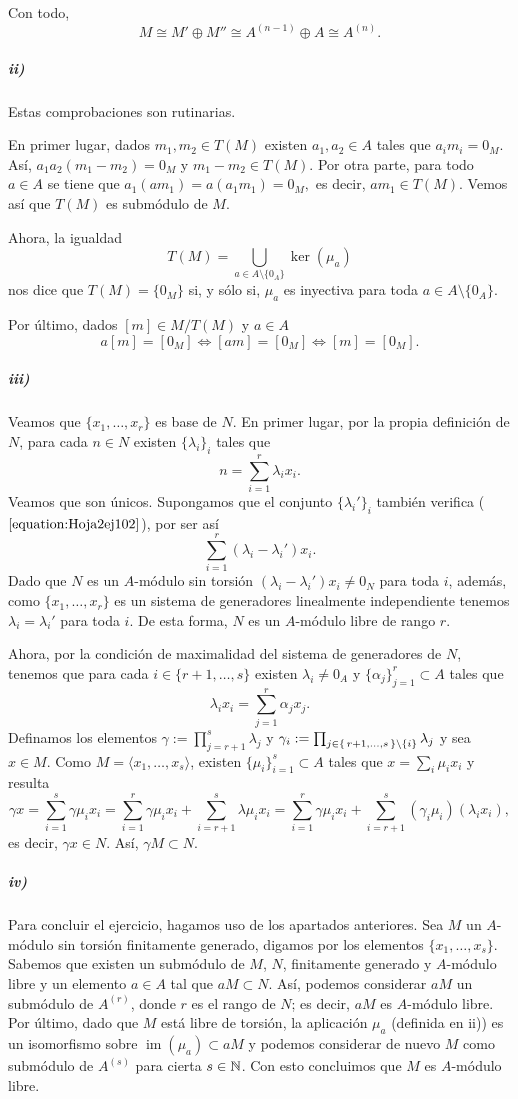\documentclass[./ejercicios.tex]{subfiles}
\begin{document}
Con todo,
$$M\cong M'\oplus M''\cong A^{(n-1)}\oplus A\cong A^{(n)}.$$

\subparagraph{ii)} Estas comprobaciones son rutinarias.

En primer lugar, dados $m_1,m_2\in T(M)$ existen $a_1,a_2\in A$ tales que $a_im_i=0_M$. Así, $a_1a_2(m_1-m_2)=0_M$ y $m_1-m_2\in T(M).$ Por otra parte, para todo $a\in A$ se tiene que $a_1(am_1)=a(a_1m_1)=0_M,$ es decir, $am_1\in T(M)$. Vemos así que $T(M)$ es submódulo de $M$.

Ahora, la igualdad
$$T(M)=\bigcup_{a\in A\setminus\{0_A\}}\ker(\mu_a)$$ nos dice que $T(M)=\{0_M\}$ si, y sólo si, $\mu_a$ es inyectiva para toda $a\in A\setminus\{0_A\}.$

Por último, dados $[m]\in M/T(M)$ y $a\in A$
$$a[m]=[0_M]\Longleftrightarrow [am]=[0_M]\Longleftrightarrow [m]=[0_M].$$

\subparagraph{iii)} Veamos que $\{x_1,\dots,x_r\}$ es base de $N$. En primer lugar, por la propia definición de $N$, para cada $n\in N$ existen $\{\lambda_i\}_i$ tales que
\begin{equation}\label{equation:Hoja2ej102}
n=\sum_{i=1}^r\lambda_ix_i.
\end{equation}
Veamos que son únicos. Supongamos que el conjunto $\{\lambda_i'\}_i$ también verifica ($\ref{equation:Hoja2ej102}$), por ser así
$$\sum_{i=1}^r(\lambda_i-\lambda_i')x_i.$$
Dado que $N$ es un $A$-módulo sin torsión $(\lambda_i-\lambda_i')x_i\neq 0_N$ para toda $i$, además, como $\{x_1,\dots,x_r\}$ es un sistema de generadores linealmente independiente tenemos $\lambda_i=\lambda_i'$ para toda $i$.
De esta forma, $N$ es un $A$-módulo libre de rango $r$.

Ahora, por la condición de maximalidad del sistema de generadores de $N$, tenemos que para cada $i\in\{r+1,\dots,s\}$ existen $\lambda_i\neq 0_A$ y $\{\alpha_j\}_{j=1}^r\subset A$ tales que
$$\lambda_ix_i=\sum_{j=1}^r\alpha_jx_j.$$
Definamos los elementos $\gamma:=\prod_{j=r+1}^s\lambda_j$ y $\gamma_i:=\prod_{j\in\set{r+1,\dots,s}\setminus\{i\}}\lambda_j$ y sea $x\in M$. Como $M=\langle x_1,\dots, x_s\rangle$, existen $\{\mu_i\}_{i=1}^s\subset A$ tales que $x=\sum_i\mu_ix_i$ y resulta
$$\gamma x=\sum_{i=1}^s\gamma\mu_ix_i=\sum_{i=1}^r\gamma\mu_ix_i+\sum_{i=r+1}^s\lambda\mu_ix_i=\sum_{i=1}^r\gamma\mu_ix_i+\sum_{i=r+1}^s(\gamma_i\mu_i)(\lambda_ix_i),$$
es decir, $\gamma x\in N$. Así, $\gamma M\subset N$.

\subparagraph{iv)} Para concluir el ejercicio, hagamos uso de los apartados anteriores. Sea $M$ un $A$-módulo sin torsión finitamente generado, digamos por los elementos $\{x_1,\dots,x_s\}$. Sabemos que existen un submódulo de $M$, $N$, finitamente generado y $A$-módulo libre y un elemento $a\in A$ tal que $aM\subset N$. Así, podemos considerar $aM$ un submódulo de $A^{(r)}$, donde $r$ es el rango de $N$; es decir, $aM$ es $A$-módulo libre. Por último, dado que $M$ está libre de torsión, la aplicación $\mu_a$ (definida en ii)) es un isomorfismo sobre $\operatorname{im}(\mu_a)\subset aM$ y podemos considerar de nuevo $M$ como submódulo de $A^{(s)}$ para cierta $s\in\mathbb{N}$. Con esto concluimos que $M$ es $A$-módulo libre.
\end{document}
